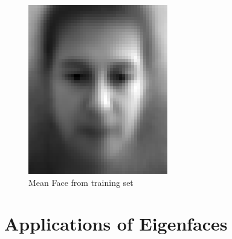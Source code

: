 \documentclass[a4paper, 10pt, conference]{ieeeconf}
\begin{document}
\begin{figure}[!ht]
  \centering
  \includegraphics[width=\linewidth]{src/mean_face}
  \caption{Mean Face from training set}
  \label{fig:mean_face}
\end{figure}


\section{Applications of Eigenfaces}

\end{document}
